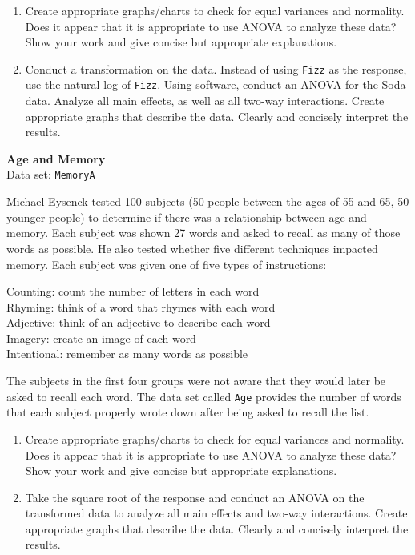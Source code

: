 \documentclass[
]{report}
\begin{document}
\begin{list}{E.}{ \setlength{\itemsep}{1.2em}}
  \begin{enumerate}
    \item Create appropriate graphs/charts to check for equal variances and normality. Does it appear that it is appropriate to use ANOVA to analyze these data? Show your work and give concise but appropriate explanations.
    \item Conduct a transformation on the data. Instead of using \texttt{Fizz} as the response, use the natural log of \texttt{Fizz}. Using software, conduct an ANOVA for the Soda data. Analyze all main effects, as well as all two-way interactions. Create appropriate graphs that describe the data. Clearly and concisely interpret the results.
  \end{enumerate}

  \item \textbf{Age and Memory}\\
  Data set: \texttt{MemoryA}

Michael Eysenck tested 100 subjects (50 people between the ages of 55 and 65, 50 younger people) to determine if there was a relationship between age and memory. Each subject was shown 27 words and asked to recall as many of those words as possible. He also tested whether five different techniques impacted memory. Each subject was given one of five types of instructions: 

Counting: count the number of letters in each word \\
Rhyming: think of a word that rhymes with each word \\
Adjective: think of an adjective to describe each word \\
Imagery: create an image of each word \\
Intentional: remember as many words as possible

The subjects in the first four groups were not aware that they would later be asked to recall each word. The data set called \texttt{Age} provides the number of words that each subject properly wrote down after being asked to recall the list.

  \begin{enumerate}
    \item Create appropriate graphs/charts to check for equal variances and normality. Does it appear that it is appropriate to use ANOVA to analyze these data? Show your work and give concise but appropriate explanations.
    \item Take the square root of the response and conduct an ANOVA on the transformed data to analyze all main effects and two-way interactions. Create appropriate graphs that describe the data. Clearly and concisely interpret the results.
  \end{enumerate}


\end{list}
\end{document}
